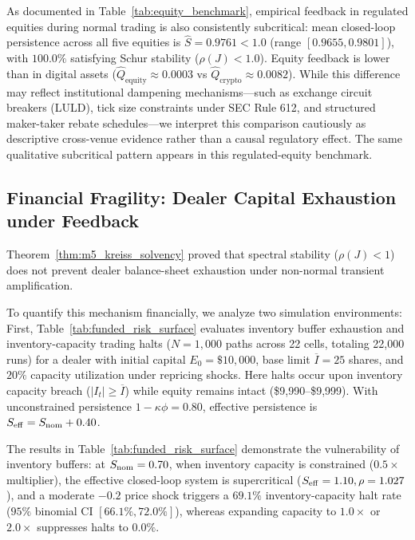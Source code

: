 \documentclass[12pt]{article}
\theoremstyle{definition}
\theoremstyle{remark}
\begin{document}
As documented in Table~\ref{tab:equity_benchmark}, empirical feedback in regulated equities during normal trading is also consistently subcritical: mean closed-loop persistence across all five equities is $\hat{S} = 0.9761 < 1.0$ (range $[0.9655, 0.9801]$), with $100.0\%$ satisfying Schur stability ($\rho(J) < 1.0$). Equity feedback is lower than in digital assets ($\hat{Q}_{\text{equity}} \approx 0.0003$ vs $\hat{Q}_{\text{crypto}} \approx 0.0082$). While this difference may reflect institutional dampening mechanisms—such as exchange circuit breakers (LULD), tick size constraints under SEC Rule 612, and structured maker-taker rebate schedules—we interpret this comparison cautiously as descriptive cross-venue evidence rather than a causal regulatory effect. The same qualitative subcritical pattern appears in this regulated-equity benchmark.

\subsection{Financial Fragility: Dealer Capital Exhaustion under Feedback}
\label{sec:dealer_solvency}
Theorem~\ref{thm:m5_kreiss_solvency} proved that spectral stability ($\rho(J) < 1$) does not prevent dealer balance-sheet exhaustion under non-normal transient amplification.

To quantify this mechanism financially, we analyze two simulation environments:
First, Table~\ref{tab:funded_risk_surface} evaluates inventory buffer exhaustion and inventory-capacity trading halts ($N = 1{,}000$ paths across 22 cells, totaling 22,000 runs) for a dealer with initial capital $E_0 = \$10{,}000$, base limit $\overline{I} = 25$ shares, and $20\%$ capacity utilization under repricing shocks. Here halts occur upon inventory capacity breach ($|I_t| \ge \overline{I}$) while equity remains intact (\$9,990--\$9,999). With unconstrained persistence $1 - \kappa \phi = 0.80$, effective persistence is $S_{\rm eff} = S_{\rm nom} + 0.40$.



The results in Table~\ref{tab:funded_risk_surface} demonstrate the vulnerability of inventory buffers: at $S_{\rm nom}=0.70$, when inventory capacity is constrained ($0.5\times$ multiplier), the effective closed-loop system is supercritical ($S_{\rm eff} = 1.10, \rho = 1.027$), and a moderate $-0.2$ price shock triggers a $69.1\%$ inventory-capacity halt rate ($95\%$ binomial CI $[66.1\%, 72.0\%]$), whereas expanding capacity to $1.0\times$ or $2.0\times$ suppresses halts to $0.0\%$.
\end{document}
